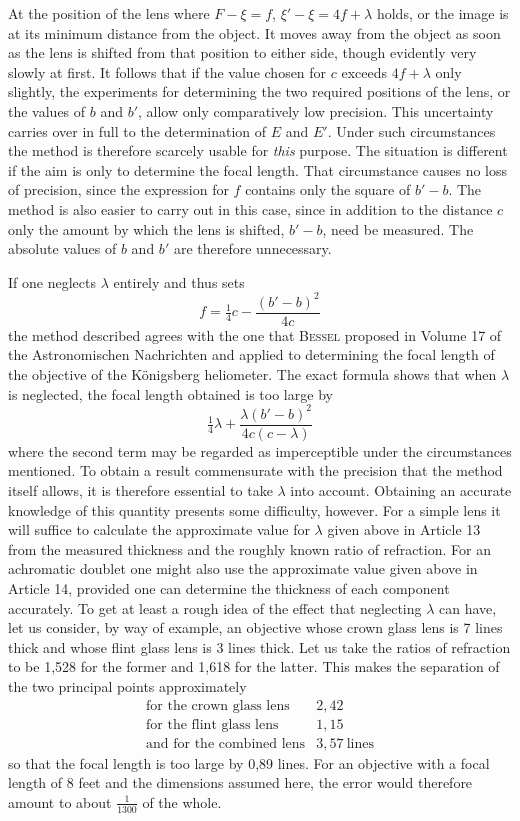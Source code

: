 At the position of the lens where $F-\xi=f$, $\xi'-\xi=4f+\lambda$ holds, or the image is at its minimum distance from the object. It moves away from the object as soon as the lens is shifted from that position to either side, though evidently very slowly at first. It follows that if the value chosen for $c$ exceeds $4f+\lambda$ only slightly, the experiments for determining the two required positions of the lens, or the values of $b$ and $b'$, allow only comparatively low precision. This uncertainty carries over in full to the determination of $E$ and $E'$. Under such circumstances the method is therefore scarcely usable for \textit{this} purpose. The situation is different if the aim is only to determine the focal length. That circumstance causes no loss of precision, since the expression for $f$ contains only the square of $b'-b$. The method is also easier to carry out in this case, since in addition to the distance $c$ only the amount by which the lens is shifted, $b'-b$, need be measured. The absolute values of $b$ and $b'$ are therefore unnecessary.

If one neglects $\lambda$ entirely and thus sets
\[
f=\tfrac14c-\frac{(b'-b)^2}{4c}
\]
the method described agrees with the one that \textsc{Bessel} proposed in Volume 17 of the Astronomischen Nachrichten and applied to determining the focal length of the objective of the Königsberg heliometer. The exact formula shows that when $\lambda$ is neglected, the focal length obtained is too large by
\[
\tfrac14\lambda+\frac{\lambda(b'-b)^2}{4c(c-\lambda)}
\]
where the second term may be regarded as imperceptible under the circumstances mentioned. To obtain a result commensurate with the precision that the method itself allows, it is therefore essential to take $\lambda$ into account. Obtaining an accurate knowledge of this quantity presents some difficulty, however. For a simple lens it will suffice to calculate the approximate value for $\lambda$ given above in Article 13 from the measured thickness and the roughly known ratio of refraction. For an achromatic doublet one might also use the approximate value given above in Article 14, provided one can determine the thickness of each component accurately. To get at least a rough idea of the effect that neglecting $\lambda$ can have, let us consider, by way of example, an objective whose crown glass lens is 7 lines thick and whose flint glass lens is 3 lines thick. Let us take the ratios of refraction to be 1,528 for the former and 1,618 for the latter. This makes the separation of the two principal points approximately
\[
\begin{array}{lr}
\text{for the crown glass lens}&2{,}42\\
\text{for the flint glass lens}&1{,}15\\
\text{and for the combined lens}&3{,}57\ \text{lines}
\end{array}
\]
so that the focal length is too large by 0,89 lines. For an objective with a focal length of 8 feet and the dimensions assumed here, the error would therefore amount to about $\frac1{1300}$ of the whole.

